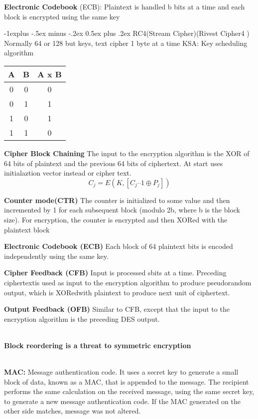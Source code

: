 \documentclass[10pt,landscape]{article}
\makeatletter
\renewcommand{\subsection}{\@startsection{subsection}{2}{0mm}%
    {-1explus -.5ex minus -.2ex}%
    {0.5ex plus .2ex}%
    {\normalfont\normalsize\bfseries}}
\makeatother
\begin{document}
\begin{multicols}{3}
\textbf{Electronic Codebook} (ECB): Plaintext is handled b bits at a
time and each block is encrypted using the same key

\subsection{RC4(Stream Cipher)(Rivest Cipher4 )}
Normally 64 or 128 but keys, text cipher 1 byte at a time
KSA: Key scheduling algorithm


\begin{wraptable}{r}{2.5cm}     %
\begin{tabular}{ |c|c|c| } 
 \hline
 A & B & A x B \\ 
 \hline
 0 & 0 & 0 \\ 
 0 & 1 & 1 \\ 
 1 & 0 & 1 \\ 
 1 & 1 & 0 \\ 
 \hline
\end{tabular}
\end{wraptable}

\textbf{Cipher Block Chaining} The input to the encryption algorithm is the XOR of 64 bits of
plaintext and the previous 64 bits of ciphertext. At start uses initialaztion vector instead or cipher text.
\lstset{language=bash,label= ,caption= ,captionpos=b,numbers=none}
\[C_j= E(K, [C_j–1 \oplus P_j])\]

\textbf{Counter mode(CTR)} The counter is initialized to some value and then incremented by 1 for
each subsequent block (modulo 2b, where b is the block size). For encryption, the counter is
encrypted and then XORed with the plaintext block

\textbf{Electronic Codebook (ECB)} Each block of 64 plaintext bits is encoded independently using
the same key.

\textbf{Cipher Feedback (CFB)} Input is processed sbits at a time. Preceding ciphertextis used as
input to the encryption algorithm to produce pseudorandom output, which is XORedwith plaintext to
produce next unit of ciphertext.

\textbf{Output Feedback (OFB)} Similar to CFB, except that the input to the encryption algorithm is
the preceding DES output.

~\\
\textbf{Block reordering is a threat to symmetric encryption}

~\\

\textbf{MAC:} Message authentication code. It uses a secret key to
generate a small block of data, known as a MAC, that is appended to
the message. The recipient performs the same calculation on the
received message, using the same secret key, to generate a new message
authentication code. If the MAC generated on the other side matches,
message was not altered.


\end{multicols}
\end{document}
